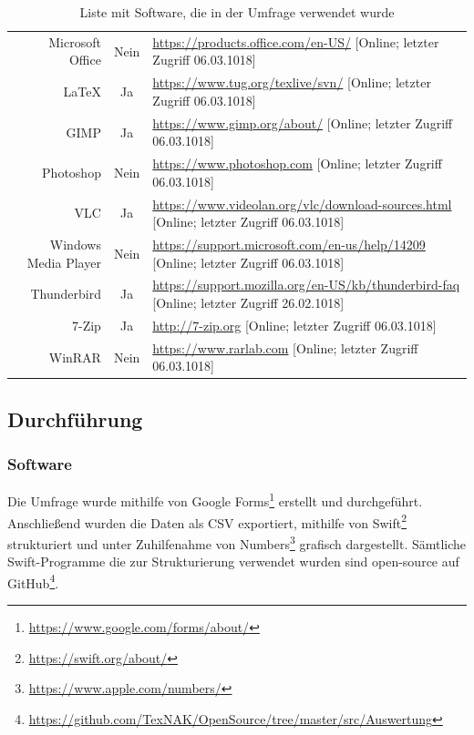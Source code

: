 \documentclass[a4paper]{article}
\begin{document}
\begin{table}[!htbp]
\begin{tabularx}{\textwidth}{rcX}
			               Microsoft Office & Nein & \tiny\url{https://products.office.com/en-US/} [Online; letzter Zugriff 06.03.1018]\\
			               LaTeX & Ja & \tiny\url{https://www.tug.org/texlive/svn/} [Online; letzter Zugriff 06.03.1018] \\
			               GIMP & Ja & \tiny\url{https://www.gimp.org/about/} [Online; letzter Zugriff 06.03.1018]\\
			               Photoshop & Nein & \tiny\url{https://www.photoshop.com} [Online; letzter Zugriff 06.03.1018]\\
			               VLC & Ja & \tiny\url{https://www.videolan.org/vlc/download-sources.html} [Online; letzter Zugriff 06.03.1018]\\
			               Windows Media Player & Nein & \tiny\url{https://support.microsoft.com/en-us/help/14209} [Online; letzter Zugriff 06.03.1018]\\
			               Thunderbird & Ja & \tiny\url{https://support.mozilla.org/en-US/kb/thunderbird-faq} [Online; letzter Zugriff 26.02.1018] \\
			               7-Zip & Ja & \tiny\url{http://7-zip.org} [Online; letzter Zugriff 06.03.1018]\\
			               WinRAR & Nein & \tiny\url{https://www.rarlab.com} [Online; letzter Zugriff 06.03.1018]
			         \end{tabularx}
			         \caption{Liste mit Software, die in der Umfrage verwendet wurde}
			         \label{table:software_examples}
			     \end{table}
			     
		\subsection{Durchführung}
            \subsubsection{Software}
                Die Umfrage wurde mithilfe von Google Forms\footnote{\url{https://www.google.com/forms/about/}} erstellt und durchgeführt. Anschließend wurden die Daten als CSV exportiert, mithilfe von Swift\footnote{\url{https://swift.org/about/}} strukturiert und unter Zuhilfenahme von Numbers\footnote{\url{https://www.apple.com/numbers/}} grafisch dargestellt. Sämtliche Swift-Programme die zur Strukturierung verwendet wurden sind open-source auf GitHub\footnote{\url{https://github.com/TexNAK/OpenSource/tree/master/src/Auswertung}}.
\end{document}
